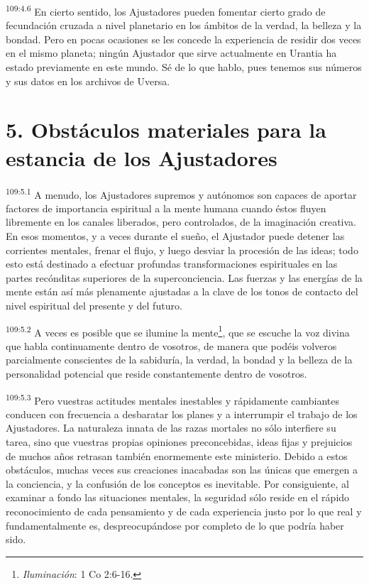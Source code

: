 \par
\textsuperscript{109:4.6} En cierto sentido, los Ajustadores pueden fomentar cierto grado de fecundación cruzada a nivel planetario en los ámbitos de la verdad, la belleza y la bondad. Pero en pocas ocasiones se les concede la experiencia de residir dos veces en el mismo planeta; ningún Ajustador que sirve actualmente en Urantia ha estado previamente en este mundo. Sé de lo que hablo, pues tenemos sus números y sus datos en los archivos de Uversa.

\section*{5. Obstáculos materiales para la estancia de los Ajustadores}
\par
\textsuperscript{109:5.1} A menudo, los Ajustadores supremos y autónomos son capaces de aportar factores de importancia espiritual a la mente humana cuando éstos fluyen libremente en los canales liberados, pero controlados, de la imaginación creativa. En esos momentos, y a veces durante el sueño, el Ajustador puede detener las corrientes mentales, frenar el flujo, y luego desviar la procesión de las ideas; todo esto está destinado a efectuar profundas transformaciones espirituales en las partes recónditas superiores de la superconciencia. Las fuerzas y las energías de la mente están así más plenamente ajustadas a la clave de los tonos de contacto del nivel espiritual del presente y del futuro.

\par
\textsuperscript{109:5.2} A veces es posible que se ilumine la mente\footnote{\textit{Iluminación}: 1 Co 2:6-16.}, que se escuche la voz divina que habla continuamente dentro de vosotros, de manera que podéis volveros parcialmente conscientes de la sabiduría, la verdad, la bondad y la belleza de la personalidad potencial que reside constantemente dentro de vosotros.

\par
\textsuperscript{109:5.3} Pero vuestras actitudes mentales inestables y rápidamente cambiantes conducen con frecuencia a desbaratar los planes y a interrumpir el trabajo de los Ajustadores. La naturaleza innata de las razas mortales no sólo interfiere su tarea, sino que vuestras propias opiniones preconcebidas, ideas fijas y prejuicios de muchos años retrasan también enormemente este ministerio. Debido a estos obstáculos, muchas veces sus creaciones inacabadas son las únicas que emergen a la conciencia, y la confusión de los conceptos es inevitable. Por consiguiente, al examinar a fondo las situaciones mentales, la seguridad sólo reside en el rápido reconocimiento de cada pensamiento y de cada experiencia justo por lo que real y fundamentalmente es, despreocupándose por completo de lo que podría haber sido.


